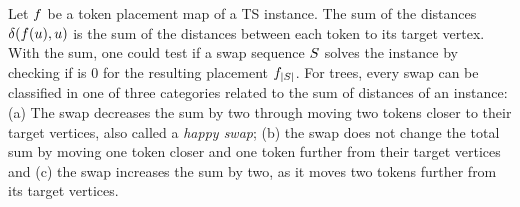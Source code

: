 \documentclass[msc,english,table,xcdraw]{ppgccufmg}
\begin{document}

Let $f$ be a token placement map of a TS instance.
The sum of the distances $\delta(f(u), u)$
is the sum of the distances between each token to its target vertex. 
With the sum, one could test if a swap sequence $S$ solves the instance
by checking if is 0 for the resulting placement $f_{|S|}$.
For trees, every swap can be classified in one of three categories related to 
the sum of distances of an instance: (a) The swap decreases the sum by two 
through moving two tokens closer to their target vertices, also called a 
\textit{happy swap}; (b) the swap does not change the total sum by moving one 
token closer and one token further from their target vertices and (c) the swap 
increases the sum by two, as it moves two tokens further from its target 
vertices.

\end{document}
